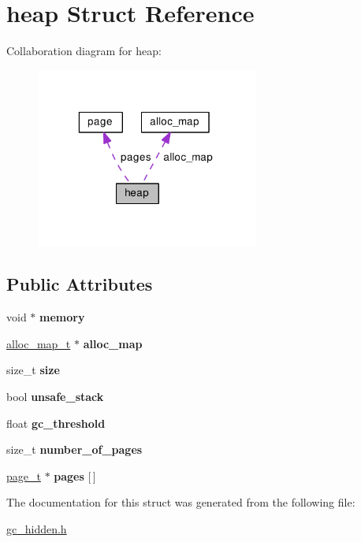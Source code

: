 \hypertarget{structheap}{\section{heap Struct Reference}
\label{structheap}
}


Collaboration diagram for heap\-:\nopagebreak
\begin{figure}[H]
\begin{center}
\leavevmode
\includegraphics[width=208pt]{structheap__coll__graph}
\end{center}
\end{figure}
\subsection*{Public Attributes}
\begin{DoxyCompactItemize}
\item 
\hypertarget{structheap_aef54d9a3db63859dcfa9a38ebb42823e}{void $\ast$ {\bfseries memory}}\label{structheap_aef54d9a3db63859dcfa9a38ebb42823e}

\item 
\hypertarget{structheap_a01357129b314f4f004b7273869a01ec2}{\hyperlink{alloc__map_8h_a1dd850d0c221c065db145344bbd56714}{alloc\-\_\-map\-\_\-t} $\ast$ {\bfseries alloc\-\_\-map}}\label{structheap_a01357129b314f4f004b7273869a01ec2}

\item 
\hypertarget{structheap_a4c25bc4241337fdea12b53bf8185070d}{size\-\_\-t {\bfseries size}}\label{structheap_a4c25bc4241337fdea12b53bf8185070d}

\item 
\hypertarget{structheap_ac060d2df3b78970d9c23fc1dcec2a921}{bool {\bfseries unsafe\-\_\-stack}}\label{structheap_ac060d2df3b78970d9c23fc1dcec2a921}

\item 
\hypertarget{structheap_aa6580886a3ce54095739d5e07b1bda74}{float {\bfseries gc\-\_\-threshold}}\label{structheap_aa6580886a3ce54095739d5e07b1bda74}

\item 
\hypertarget{structheap_ade55f22f4a2861e9f3a3e3bc6eb32471}{size\-\_\-t {\bfseries number\-\_\-of\-\_\-pages}}\label{structheap_ade55f22f4a2861e9f3a3e3bc6eb32471}

\item 
\hypertarget{structheap_af87be11cb17953345d1ed8034900cadf}{\hyperlink{structpage}{page\-\_\-t} $\ast$ {\bfseries pages} \mbox{[}$\,$\mbox{]}}\label{structheap_af87be11cb17953345d1ed8034900cadf}

\end{DoxyCompactItemize}


The documentation for this struct was generated from the following file\-:\begin{DoxyCompactItemize}
\item 
\hyperlink{gc__hidden_8h}{gc\-\_\-hidden.\-h}\end{DoxyCompactItemize}
